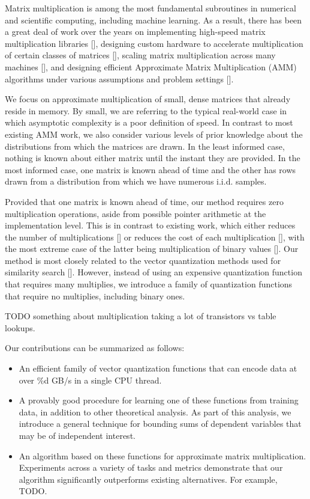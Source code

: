 
Matrix multiplication is among the most fundamental subroutines in numerical and scientific computing, including machine learning. As a result, there has been a great deal of work over the years on implementing high-speed matrix multiplication libraries [], designing custom hardware to accelerate multiplication of certain classes of matrices [], scaling matrix multiplication across many machines [], and designing efficient Approximate Matrix Multiplication (AMM) algorithms under various assumptions and problem settings [].

We focus on approximate multiplication of small, dense matrices that already reside in memory. By small, we are referring to the typical real-world case in which asymptotic complexity is a poor definition of speed. In contrast to most existing AMM work, we also consider various levels of prior knowledge about the distributions from which the matrices are drawn. In the least informed case, nothing is known about either matrix until the instant they are provided. In the most informed case, one matrix is known ahead of time and the other has rows drawn from a distribution from which we have numerous i.i.d. samples.

Provided that one matrix is known ahead of time, our method requires zero multiplication operations, aside from possible pointer arithmetic at the implementation level. This is in contrast to existing work, which either reduces the number of multiplications [] or reduces the cost of each multiplication [], with the most extreme case of the latter being multiplication of binary values [].
Our method is most closely related to the vector quantization methods used for similarity search []. However, instead of using an expensive quantization function that requires many multiplies, we introduce a family of quantization functions that require no multiplies, including binary ones.

TODO something about multiplication taking a lot of transistors vs table lookups.

Our contributions can be summarized as follows:
\begin{itemize}
    \item An efficient family of vector quantization functions that can encode data at over \%d GB/s in a single CPU thread.
    \item A provably good procedure for learning one of these functions from training data, in addition to other theoretical analysis. As part of this analysis, we introduce a general technique for bounding sums of dependent variables that may be of independent interest.
    \item An algorithm based on these functions for approximate matrix multiplication. Experiments across a variety of tasks and metrics demonstrate that our algorithm significantly outperforms existing alternatives. For example, TODO.
\end{itemize}


